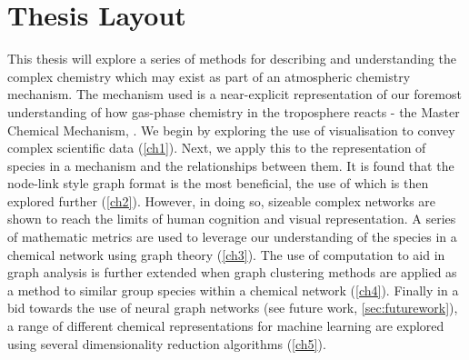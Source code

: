 \section{Thesis Layout}
This thesis will explore a series of methods for describing and understanding the complex chemistry which may exist as part of an atmospheric chemistry mechanism. The mechanism used is a near-explicit representation of our foremost understanding of how gas-phase chemistry in the troposphere reacts - the Master Chemical Mechanism, \citep{mcm}.
We begin by exploring the use of visualisation to convey complex scientific data (\autoref{ch1}). Next, we apply this to the representation of species in a mechanism and the relationships between them. It is found that the node-link style graph format is the most beneficial, the use of which is then explored further (\autoref{ch2}).
However, in doing so, sizeable complex networks are shown to reach the limits of human cognition and visual representation. A series of mathematic metrics are used to leverage our understanding of the species in a chemical network using graph theory (\autoref{ch3}). The use of computation to aid in graph analysis is further extended when graph clustering methods are applied as a method to similar group species within a chemical network (\autoref{ch4}). Finally in a bid towards the use of neural graph networks (see future work, \autoref{sec:futurework}), a range of different chemical representations for machine learning are explored using several dimensionality reduction algorithms (\autoref{ch5}).
